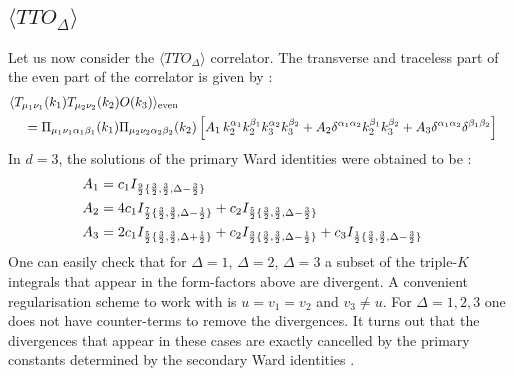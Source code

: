 \documentclass[a4paper,11pt]{article}
\begin{document}
\subsection{$\langle TTO_\Delta\rangle$}
Let us now consider the $\langle TTO_\Delta\rangle$ correlator.
The transverse and traceless part of the even part of the correlator is given by \cite{Bzowski:2018fql} :
%
\begin{align}
\label{ttonewansatz}
&\langle T_{\mu_1\nu_1}(k_1)T_{\mu_2\nu_2}(k_2)O(k_3) \rangle_{\text{even}}\cr
&\hspace{.4cm}=\Pi_{\mu_1\nu_1\alpha_1\beta_1}(k_1)\Pi_{\mu_2\nu_2\alpha_2\beta_2}(k_2)\left[A_1\,k_2^{\alpha_1}k_2^{\beta_1}k_3^{\alpha_2}k_3^{\beta_2}+A_2\delta^{\alpha_1\alpha_2}k_2^{\beta_1}k_3^{\beta_2}+A_3\delta^{\alpha_1\alpha_2}\delta^{\beta_1\beta_2}\right]\cr
\end{align}
% 
In $d=3$, the solutions of the primary Ward identities were obtained to be \cite{Bzowski:2018fql} :
%
\begin{align}
A_1&=c_1 I_{\frac 92\{\frac 32,\frac 32,\Delta-\frac 32\}}\cr
A_2&=4c_1 I_{\frac 72\{\frac 32,\frac 32,\Delta-\frac 12\}}+c_2 I_{\frac 52\{\frac 32,\frac 32,\Delta-\frac 32\}}\cr
A_3&=2c_1 I_{\frac 52\{\frac 32,\frac 32,\Delta+\frac 12\}}+c_2 I_{\frac 32\{\frac 32,\frac 32,\Delta-\frac 12\}}+c_3 I_{\frac 12\{\frac 32,\frac 32,\Delta-\frac 32\}}
\end{align}
%
One can easily check that for $\Delta=1$, $\Delta=2$, $\Delta=3$ a subset of the triple-$K$ integrals that appear in the form-factors above are divergent. A convenient regularisation scheme to work with is $u=v_1=v_2$ and $v_3\ne u$. 
For $\Delta=1,2,3$ one does not have counter-terms to remove the divergences. It turns out that the divergences that appear in these cases are exactly cancelled by the primary constants determined by the secondary Ward identities \cite{Bzowski:2018fql}. 
\end{document}
